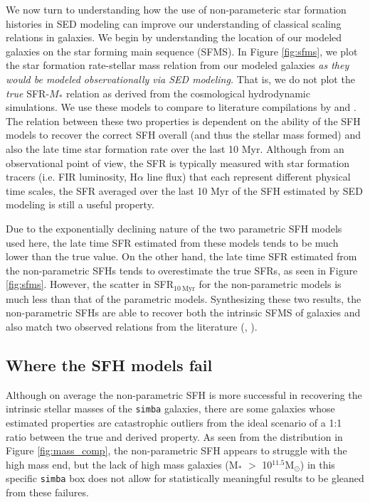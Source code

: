 \documentclass[twocolumn]{aastex62}
\begin{document}
We now turn to understanding how the use of non-parameteric star formation histories in SED modeling can improve our understanding of classical scaling relations in galaxies.  We begin by understanding the location of our modeled galaxies on the star forming main sequence (SFMS).  In Figure \ref{fig:sfms}, we plot the star formation rate-stellar mass relation from our modeled galaxies {\it as they would be modeled observationally via SED modeling.}  That is, we do not plot the {\it true} SFR-$M_*$ relation as derived from the cosmological hydrodynamic simulations.  We use these models to compare to literature compilations by \citet{schreiber_herschel_2015} and \citet{boogaard_muse_2018}. The relation between these two properties is dependent on the ability of the SFH models to recover the correct SFH overall (and thus the stellar mass formed) and also the late time star formation rate over the last 10 Myr. Although from an observational point of view, the SFR is typically measured with star formation tracers (i.e. FIR luminosity, H$\alpha$ line flux) that each represent different physical time scales, the SFR averaged over the last 10 Myr of the SFH estimated by SED modeling is still a useful property. 

Due to the exponentially declining nature of the two parametric SFH models used here, the late time SFR estimated from these models tends to be much lower than the true value. On the other hand, the late time SFR estimated from the non-parametric SFHs tends to overestimate the true SFRs, as seen in Figure \ref{fig:sfms}. However, the scatter in SFR$_{10 \: \mathrm{Myr}}$ for the non-parametric models is much less than that of the parametric models. Synthesizing these two results, the non-parametric SFHs are able to recover both the intrinsic SFMS of galaxies and also match two observed relations from the literature (\cite{boogaard_muse_2018}, \cite{schreiber_herschel_2015}). 

\subsection{Where the SFH models fail}\label{section:fail}

Although on average the non-parametric SFH is more successful in recovering the intrinsic stellar masses of the \texttt{simba} galaxies, there are some galaxies whose estimated properties are catastrophic outliers from the ideal scenario of a 1:1 ratio between the true and derived property. As seen from the distribution in Figure \ref{fig:mass_comp}, the non-parametric SFH appears to struggle with the high mass end, but the lack of high mass galaxies (M$_*$ $>$ 10$^{11.5} \mathrm{M}_{\odot}$) in this specific \texttt{simba} box does not allow for statistically meaningful results to be gleaned from these failures. 
\end{document}
